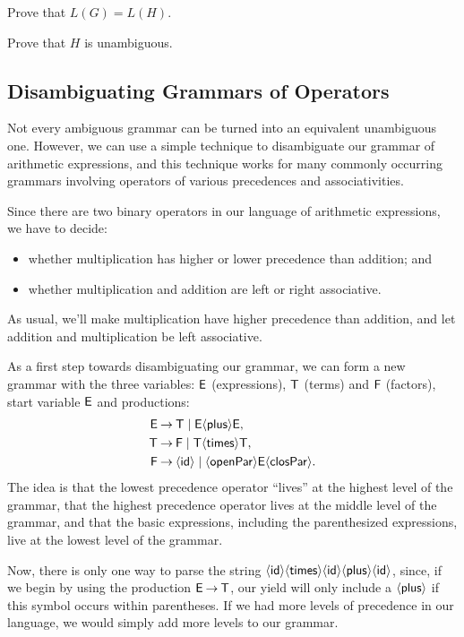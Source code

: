 \begin{exercise}
Prove that $L(G) = L(H)$.
\end{exercise}

\begin{exercise}
Prove that $H$ is unambiguous.
\end{exercise}

\subsection{Disambiguating Grammars of Operators}

Not every ambiguous grammar can be turned into an equivalent
unambiguous one.  However, we can use a simple technique to
disambiguate our grammar of arithmetic expressions, and this technique
works for many commonly occurring grammars involving operators of
various precedences and associativities.

Since there are two binary operators in our language of arithmetic
expressions, we have to decide:
\begin{itemize}
\item whether multiplication has higher or lower precedence than
  addition; and

\item whether multiplication and addition are left or right
  associative.
\end{itemize}
As usual, we'll make multiplication have higher precedence than
addition, and let addition and multiplication be left associative.

As a first step towards disambiguating our grammar, we can form
a new grammar with the three variables: $\mathsf{E}$ (expressions),
$\mathsf{T}$ (terms) and $\mathsf{F}$ (factors), start variable $\mathsf{E}$
and productions:
\begin{align*}
  \mathsf{E} &\mathbin{\to} \mathsf{T}\mid \mathsf{E}{\langle\mathsf{plus}\rangle}\mathsf{E} , \\
  \mathsf{T} &\mathbin{\to} \mathsf{F}\mid \mathsf{T}{\langle\mathsf{times}\rangle}\mathsf{T} , \\
  \mathsf{F} &\mathbin{\to} {\langle\mathsf{id}\rangle} \mid {\langle\mathsf{openPar}\rangle}\mathsf{E}{\langle\mathsf{closPar}\rangle} .
\end{align*}
The idea is that the lowest precedence operator ``lives'' at the
highest level of the grammar, that the highest precedence operator
lives at the middle level of the grammar, and that the basic
expressions, including the parenthesized expressions, live at
the lowest level of the grammar.

Now, there is only one way to parse the string
${\langle\mathsf{id}\rangle}{\langle\mathsf{times}\rangle}{\langle\mathsf{id}\rangle}{\langle\mathsf{plus}\rangle}{\langle\mathsf{id}\rangle}$, since, if we begin
by using the production $\mathsf{E}\mathbin{\to}\mathsf{T}$, our yield will only
include a ${\langle\mathsf{plus}\rangle}$ if this symbol occurs within parentheses.
If we had more levels of precedence in our language, we would simply
add more levels to our grammar.

